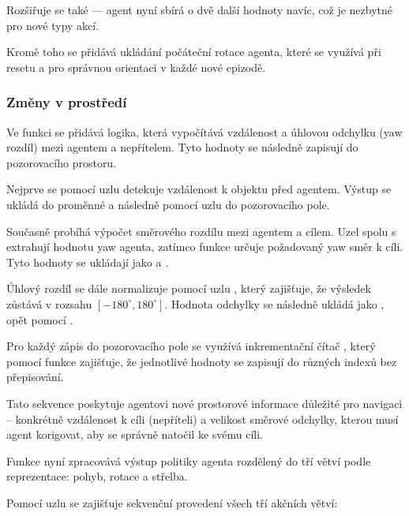 Rozšiřuje se také  — agent nyní sbírá o dvě další hodnoty navíc, což je nezbytné pro nové typy akcí.

Kromě toho se přidává ukládání počáteční rotace agenta, které se využívá při resetu a pro správnou orientaci v každé nové epizodě.

\newpage

\subsubsection{Změny v prostředí}
Ve funkci  se přidává logika, která vypočítává vzdálenost a úhlovou odchylku (yaw rozdíl) mezi agentem a nepřítelem. Tyto hodnoty se následně zapisují do pozorovacího prostoru.

Nejprve se pomocí uzlu  detekuje vzdálenost k objektu před agentem. Výstup  se ukládá do proměnné  a následně pomocí uzlu  do pozorovacího pole.

Současně probíhá výpočet směrového rozdílu mezi agentem a cílem. Uzel  spolu s  extrahují hodnotu yaw agenta, zatímco funkce  určuje požadovaný yaw směr k cíli. Tyto hodnoty se ukládají jako  a .

Úhlový rozdíl se dále normalizuje pomocí uzlu , který zajišťuje, že výsledek zůstává v rozsahu $[-180^\circ, 180^\circ]$. Hodnota odchylky se následně ukládá jako , opět pomocí .

Pro každý zápis do pozorovacího pole se využívá inkrementační čítač , který pomocí funkce  zajišťuje, že jednotlivé hodnoty se zapisují do různých indexů bez přepisování.

Tato sekvence poskytuje agentovi nové prostorové informace důležité pro navigaci – konkrétně vzdálenost k cíli (nepříteli) a velikost směrové odchylky, kterou musí agent korigovat, aby se správně natočil ke svému cíli.

Funkce  nyní zpracovává výstup politiky agenta rozdělený do tří větví podle  reprezentace: pohyb, rotace a střelba.

\newpage

Pomocí uzlu  se zajišťuje sekvenční provedení všech tří akčních větví:

